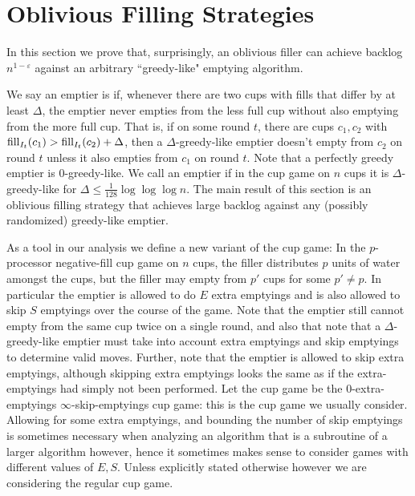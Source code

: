 \section{Oblivious Filling Strategies}\label{sec:oblivious}
In this section we prove that, surprisingly, an oblivious filler can
achieve backlog $n^{1-\varepsilon}$ against an arbitrary
``greedy-like" emptying algorithm.

We say an emptier is  if, whenever there
are two cups with fills that differ by at least $\Delta$, the emptier
never empties from the less full cup without also emptying from the
more full cup. That is, if on some round $t$, there are cups
$c_1, c_2$ with $\operatorname{\text{\textup{fill}}}_{I_t}(c_1) > \operatorname{\text{\textup{fill}}}_{I_t}(c_2) + \Delta$, then a
$\Delta$-greedy-like emptier doesn't empty from $c_2$ on round $t$
unless it also empties from $c_1$ on round $t$. Note that a perfectly
greedy emptier is $0$-greedy-like. We call an emptier
 if in the cup game on $n$ cups it is
$\Delta$-greedy-like for $\Delta \le \frac{1}{128} \log\log\log
n$. The main result of this section is an oblivious filling strategy
that achieves large backlog against any (possibly randomized)
greedy-like emptier.


As a tool in our analysis we define a new variant of the cup game: In
the $p$-processor  
negative-fill cup game on $n$ cups, the filler distributes $p$ units
of water amongst the cups, but the filler may empty from $p'$ cups for
some $p' \neq p$. In particular the emptier is allowed to do $E$ extra
emptyings and is also allowed to skip $S$ emptyings over the course of
the game. Note that the emptier still cannot empty from the same cup
twice on a single round, and also that note that a
$\Delta$-greedy-like emptier must take into account extra emptyings
and skip emptyings to determine valid moves. Further, note that the
emptier is allowed to skip extra emptyings, although skipping extra
emptyings looks the same as if the extra-emptyings had simply not been
performed.  Let the  cup game be the $0$-extra-emptyings
$\infty$-skip-emptyings cup game: this is the cup game we usually
consider.
Allowing for some extra emptyings, and bounding the number of skip
emptyings is sometimes necessary when analyzing an algorithm that is a
subroutine of a larger algorithm however, hence it sometimes makes
sense to consider games with different values of $E,S$. Unless
explicitly stated otherwise however we are considering the regular cup
game.

